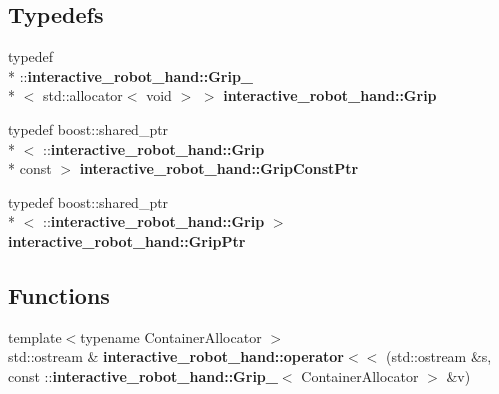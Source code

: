 \subsection*{Typedefs}
\begin{DoxyCompactItemize}
\item 
typedef \\*
\-::{\bf interactive\-\_\-robot\-\_\-hand\-::\-Grip\-\_\-}\\*
$<$ std\-::allocator$<$ void $>$ $>$ {\bf interactive\-\_\-robot\-\_\-hand\-::\-Grip}
\item 
typedef boost\-::shared\-\_\-ptr\\*
$<$ \-::{\bf interactive\-\_\-robot\-\_\-hand\-::\-Grip} \\*
const  $>$ {\bf interactive\-\_\-robot\-\_\-hand\-::\-Grip\-Const\-Ptr}
\item 
typedef boost\-::shared\-\_\-ptr\\*
$<$ \-::{\bf interactive\-\_\-robot\-\_\-hand\-::\-Grip} $>$ {\bf interactive\-\_\-robot\-\_\-hand\-::\-Grip\-Ptr}
\end{DoxyCompactItemize}
\subsection*{Functions}
\begin{DoxyCompactItemize}
\item 
{\footnotesize template$<$typename Container\-Allocator $>$ }\\std\-::ostream \& {\bf interactive\-\_\-robot\-\_\-hand\-::operator$<$$<$} (std\-::ostream \&s, const \-::{\bf interactive\-\_\-robot\-\_\-hand\-::\-Grip\-\_\-}$<$ Container\-Allocator $>$ \&v)
\end{DoxyCompactItemize}
